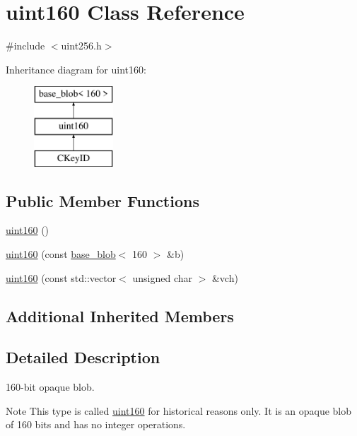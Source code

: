 \hypertarget{classuint160}{}\section{uint160 Class Reference}
\label{classuint160}


{\ttfamily \#include $<$uint256.\+h$>$}

Inheritance diagram for uint160\+:\begin{figure}[H]
\begin{center}
\leavevmode
\includegraphics[height=3.000000cm]{classuint160}
\end{center}
\end{figure}
\subsection*{Public Member Functions}
\begin{DoxyCompactItemize}
\item 
\hyperlink{classuint160_a66918f25b891415f2a9bbbb1dfdbedbd}{uint160} ()
\item 
\hyperlink{classuint160_aafc05eec384bffea281460902ad40d8d}{uint160} (const \hyperlink{classbase__blob}{base\+\_\+blob}$<$ 160 $>$ \&b)
\item 
\hyperlink{classuint160_a92bd85c77e73d6642f9bb7519cbd480c}{uint160} (const std\+::vector$<$ unsigned char $>$ \&vch)
\end{DoxyCompactItemize}
\subsection*{Additional Inherited Members}


\subsection{Detailed Description}
160-\/bit opaque blob. \begin{DoxyNote}{Note}
This type is called \hyperlink{classuint160}{uint160} for historical reasons only. It is an opaque blob of 160 bits and has no integer operations. 
\end{DoxyNote}



